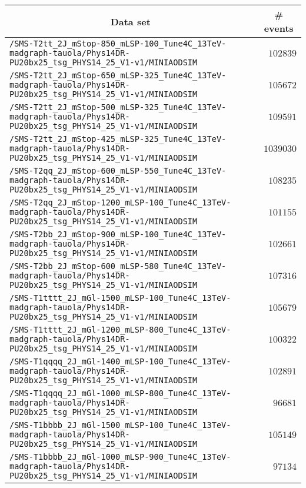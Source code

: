 \begin{center}
\begin{tabular}{lr}
\hline\hline
\multicolumn{1}{c}{Data set}&\multicolumn{1}{c}{\# events}\tabularnewline
\hline
\verb!/SMS-T2tt_2J_mStop-850_mLSP-100_Tune4C_13TeV-madgraph-tauola/Phys14DR-PU20bx25_tsg_PHYS14_25_V1-v1/MINIAODSIM! &$ 102839$\tabularnewline
\verb!/SMS-T2tt_2J_mStop-650_mLSP-325_Tune4C_13TeV-madgraph-tauola/Phys14DR-PU20bx25_tsg_PHYS14_25_V1-v1/MINIAODSIM! &$ 105672$\tabularnewline
\verb!/SMS-T2tt_2J_mStop-500_mLSP-325_Tune4C_13TeV-madgraph-tauola/Phys14DR-PU20bx25_tsg_PHYS14_25_V1-v1/MINIAODSIM! &$ 109591$\tabularnewline
\verb!/SMS-T2tt_2J_mStop-425_mLSP-325_Tune4C_13TeV-madgraph-tauola/Phys14DR-PU20bx25_tsg_PHYS14_25_V1-v1/MINIAODSIM! &$1039030$\tabularnewline
\verb!/SMS-T2qq_2J_mStop-600_mLSP-550_Tune4C_13TeV-madgraph-tauola/Phys14DR-PU20bx25_tsg_PHYS14_25_V1-v1/MINIAODSIM! &$ 108235$\tabularnewline
\verb!/SMS-T2qq_2J_mStop-1200_mLSP-100_Tune4C_13TeV-madgraph-tauola/Phys14DR-PU20bx25_tsg_PHYS14_25_V1-v1/MINIAODSIM! &$ 101155$\tabularnewline
\verb!/SMS-T2bb_2J_mStop-900_mLSP-100_Tune4C_13TeV-madgraph-tauola/Phys14DR-PU20bx25_tsg_PHYS14_25_V1-v1/MINIAODSIM! &$ 102661$\tabularnewline
\verb!/SMS-T2bb_2J_mStop-600_mLSP-580_Tune4C_13TeV-madgraph-tauola/Phys14DR-PU20bx25_tsg_PHYS14_25_V1-v1/MINIAODSIM! &$ 107316$\tabularnewline
\verb!/SMS-T1tttt_2J_mGl-1500_mLSP-100_Tune4C_13TeV-madgraph-tauola/Phys14DR-PU20bx25_tsg_PHYS14_25_V1-v1/MINIAODSIM! &$ 105679$\tabularnewline
\verb!/SMS-T1tttt_2J_mGl-1200_mLSP-800_Tune4C_13TeV-madgraph-tauola/Phys14DR-PU20bx25_tsg_PHYS14_25_V1-v1/MINIAODSIM! &$ 100322$\tabularnewline
\verb!/SMS-T1qqqq_2J_mGl-1400_mLSP-100_Tune4C_13TeV-madgraph-tauola/Phys14DR-PU20bx25_tsg_PHYS14_25_V1-v1/MINIAODSIM! &$ 102891$\tabularnewline
\verb!/SMS-T1qqqq_2J_mGl-1000_mLSP-800_Tune4C_13TeV-madgraph-tauola/Phys14DR-PU20bx25_tsg_PHYS14_25_V1-v1/MINIAODSIM! &$  96681$\tabularnewline
\verb!/SMS-T1bbbb_2J_mGl-1500_mLSP-100_Tune4C_13TeV-madgraph-tauola/Phys14DR-PU20bx25_tsg_PHYS14_25_V1-v1/MINIAODSIM! &$ 105149$\tabularnewline
\verb!/SMS-T1bbbb_2J_mGl-1000_mLSP-900_Tune4C_13TeV-madgraph-tauola/Phys14DR-PU20bx25_tsg_PHYS14_25_V1-v1/MINIAODSIM! &$  97134$\tabularnewline
\hline
\end{tabular}\end{center}
